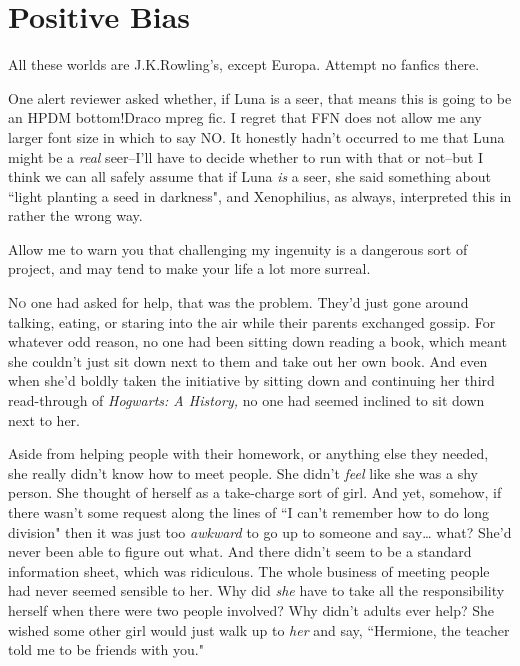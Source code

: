 \chapter{Positive Bias}

\begin{chapterOpeningAuthorNote}
All these worlds are J.\?K.\?Rowling's, except Europa. Attempt no fanfics there.

One alert reviewer asked whether, if Luna is a seer, that means this is going to be an HPDM bottom!Draco mpreg fic. I regret that FFN does not allow me any larger font size in which to say NO. It honestly hadn't occurred to me that Luna might be a \emph{real} seer\---I'll have to decide whether to run with that or not\---but I think we can all safely assume that if Luna \emph{is} a seer, she said something about ``light planting a seed in darkness", and Xenophilius, as always, interpreted this in rather the wrong way.
\end{chapterOpeningAuthorNote}
\begin{chapterOpeningQuote}
Allow me to warn you that challenging my ingenuity is a dangerous sort of project, and may tend to make your life a lot more surreal.
\end{chapterOpeningQuote}

\lettrine{N}{o} one had asked for help, that was the problem. They'd just gone around talking, eating, or staring into the air while their parents exchanged gossip. For whatever odd reason, no one had been sitting down reading a book, which meant she couldn't just sit down next to them and take out her own book. And even when she'd boldly taken the initiative by sitting down and continuing her third read-through of \emph{Hogwarts: A History,} no one had seemed inclined to sit down next to her.

Aside from helping people with their homework, or anything else they needed, she really didn't know how to meet people. She didn't \emph{feel} like she was a shy person. She thought of herself as a take-charge sort of girl. And yet, somehow, if there wasn't some request along the lines of ``I can't remember how to do long division" then it was just too \emph{awkward} to go up to someone and say{\ldots} what? She'd never been able to figure out what. And there didn't seem to be a standard information sheet, which was ridiculous. The whole business of meeting people had never seemed sensible to her. Why did \emph{she} have to take all the responsibility herself when there were two people involved? Why didn't adults ever help? She wished some other girl would just walk up to \emph{her} and say, ``Hermione, the teacher told me to be friends with you."

